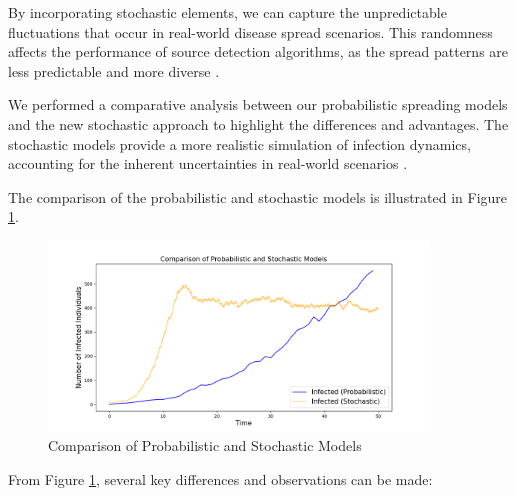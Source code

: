 By incorporating stochastic elements, we can capture the unpredictable fluctuations that occur in real-world disease spread scenarios. This randomness affects the performance of source detection algorithms, as the spread patterns are less predictable and more diverse \cite{britton2010, keeling2008}.

We performed a comparative analysis between our probabilistic spreading models and the new stochastic approach to highlight the differences and advantages. The stochastic models provide a more realistic simulation of infection dynamics, accounting for the inherent uncertainties in real-world scenarios \cite{allen2017, ball2016}.

The comparison of the probabilistic and stochastic models is illustrated in Figure \ref{fig:Comparison_Probabilistic_Stochastic}.

\begin{figure}[H]
    \centering
    \includegraphics[width=0.9\textwidth]{img/Comparison_Probabilistic_Stochastic Models.png}
    \caption{Comparison of Probabilistic and Stochastic Models}
    \label{fig:Comparison_Probabilistic_Stochastic}
\end{figure}

From Figure \ref{fig:Comparison_Probabilistic_Stochastic}, several key differences and observations can be made:

